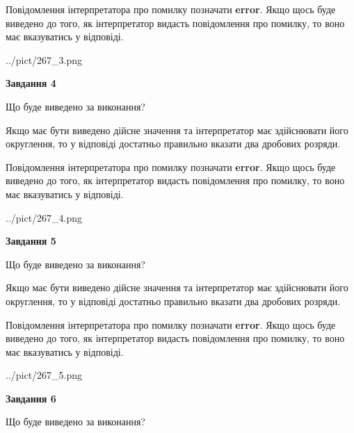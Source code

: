 \documentclass[12pt, ukrainian]{article}
\begin{document}
{\begin {Large}
Повідомлення інтерпретатора про помилку позначати \textbf{error}.
Якщо щось буде виведено до того, як інтерпретатор видасть повідомлення про помилку, 
то воно має вказуватись у відповіді. \par

\begin{center}
	{../pict/267_3.png}
\end{center}
\newpage

{\begin {center}\textbf{Завдання 4}\end {center}}\par
Що буде виведено за виконання? \par

Якщо має бути виведено дійсне значення та інтерпретатор має здійснювати його округлення, 
то у відповіді достатньо правильно вказати два дробових розряди.

Повідомлення інтерпретатора про помилку позначати \textbf{error}.
Якщо щось буде виведено до того, як інтерпретатор видасть повідомлення про помилку, 
то воно має вказуватись у відповіді. \par

\begin{center}
	{../pict/267_4.png}
\end{center}
\newpage

{\begin {center}\textbf{Завдання 5}\end {center}}\par
Що буде виведено за виконання? \par

Якщо має бути виведено дійсне значення та інтерпретатор має здійснювати його округлення, 
то у відповіді достатньо правильно вказати два дробових розряди.

Повідомлення інтерпретатора про помилку позначати \textbf{error}.
Якщо щось буде виведено до того, як інтерпретатор видасть повідомлення про помилку, 
то воно має вказуватись у відповіді. \par

\begin{center}
	{../pict/267_5.png}
\end{center}
\newpage

{\begin {center}\textbf{Завдання 6}\end {center}}\par
Що буде виведено за виконання? \par


\end{Large}}
\end{document}

